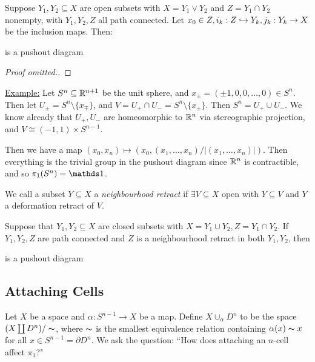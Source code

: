 \documentclass[10pt,a4paper]{article}
\begin{document}
\begin{theorem}
Suppose $Y_1, Y_2 \subseteq X$ are open subsets with $X = Y_1 \vee Y_2$ and $ Z = Y_1 \cap Y_2$ nonempty, with $Y_1, Y_2, Z$ all path connected. Let $x_0 \in Z, i_k :Z\hookrightarrow Y_k, j_k:Y_k \to X$ be the inclusion maps. Then:
\begin{center}
\end{center}
is a pushout diagram
\end{theorem}
\begin{proof}[Proof omitted.]
\end{proof}
\underline{Example:} Let $S^n \subseteq \mathbb{R}^{n+1}$ be the unit sphere, and $x_{\pm} = (\pm 1, 0, 0, \ldots, 0) \in S^n$. Then let $U_{\pm} = S^n \setminus \{x_{\mp}\}$, and $V = U_{+} \cap U_{-} = S^n \setminus \{x_{\pm}\}$. Then $S^n = U_+ \cup U_-$. We know already that $U_+, U_-$ are homeomorphic to $\mathbb{R}^n$ via stereographic projection, and $V \cong (-1, 1) \times S^{n-1}$.

Then we have a map $(x_0, x_n) \mapsto (x_0, (x_1,\ldots, x_n)/|(x_1, \ldots, x_n)|)$. Then everything is the trivial group in the pushout diagram since $\mathbb{R}^n$ is contractible, and so $\pi_1(S^n) = \one$.

We call a subset $Y \subseteq X$ a \emph{neighbourhood retract} if $\exists V \subseteq X$ open with $Y \subseteq V$ and $Y$ a deformation retract of $V$.

\begin{theorem}
Suppose that $Y_1, Y_2 \subseteq X$ are closed subsets with $X = Y_1 \cup Y_2, Z = Y_1 \cap Y_2$. If $Y_1, Y_2, Z$ are path connected and $Z$ is a neighbourhood retract in both $Y_1, Y_2$, then 
\begin{center}
\end{center}
is a pushout diagram
\end{theorem}
\subsection*{Attaching Cells}
Let $X$ be a space and $\alpha : S^{n-1} \to X$ be a map. Define $X \cup_\alpha D^n$ to be the space $(X \coprod D^n) / \thicksim$, where $\thicksim$ is the smallest equivalence relation containing $\alpha(x) \thicksim x$ for all $x \in S^{n-1} = \partial D^n$. We ask the question: ``How does attaching an $n$-cell affect $\pi_1$?"
\end{document}
